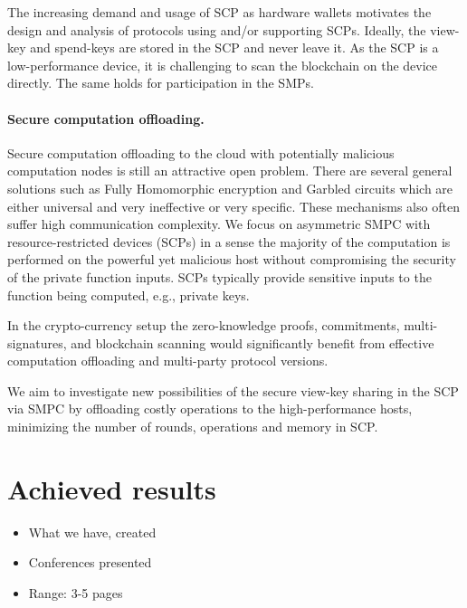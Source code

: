 \documentclass[
  digital, %
  twoside, %
  table,   %
  lof,     %
  lot,     %
]{fithesis3}
\begin{document}
\begin{ecmmnt}
The increasing demand and usage of SCP as hardware wallets motivates the design and analysis of protocols using and/or supporting SCPs. Ideally, the view-key and spend-keys are stored in the SCP and never leave it. As the SCP is a low-performance device, it is challenging to scan the blockchain on the device directly. The same holds for participation in the SMPs.

\paragraph{Secure computation offloading.}
Secure computation offloading to the cloud with potentially malicious computation nodes is still an attractive open problem. There are several general solutions such as Fully Homomorphic encryption and Garbled circuits which are either universal and very ineffective or very specific. These mechanisms also often suffer high communication complexity. 
We focus on asymmetric SMPC with resource-restricted devices (SCPs) in a sense the majority of the computation is performed on the powerful yet malicious host without compromising the security of the private function inputs. SCPs typically provide sensitive inputs to the function being computed, e.g., private keys. 

In the crypto-currency setup the zero-knowledge proofs, commitments, multi-signatures, and blockchain scanning would significantly benefit from effective computation offloading and multi-party protocol versions.

We aim to investigate new possibilities of the secure view-key sharing in the SCP via SMPC by offloading costly operations to the high-performance hosts, minimizing the number of rounds, operations and memory in SCP.



\section{Achieved results}
\begin{shaded}
\begin{itemize}
    \item What we have, created
    \item Conferences presented
    \item Range: 3-5 pages
\end{itemize}
\end{shaded}


\end{ecmmnt}
\end{document}
